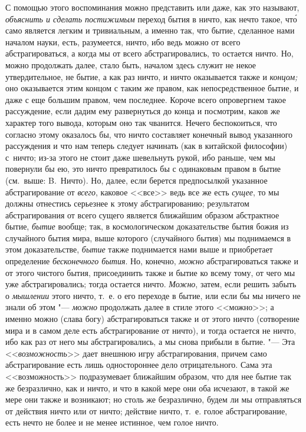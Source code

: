 С помощью этого воспоминания можно представить или даже, как это называют,
{\em объяснить и сделать постижимым} переход бытия в ничто, как нечто такое,
чт\'{о} само является легким и тривиальным, а именно так, что бытие, сделанное
нами началом науки, есть, разумеется, ничто, ибо ведь можно от всего
абстрагироваться, а когда мы от всего абстрагировались, то остается ничто. Но,
можно продолжать далее, стало быть, началом здесь служит не некое
утвердительное, не бытие, а как раз ничто, и ничто оказывается также и
{\em концом;} оно оказывается этим концом с таким же правом, как
непосредственное бытие, и даже с еще большим правом, чем последнее. Короче
всего опровергнем такое рассуждение, если дадим ему развернуться до конца и
посмотрим, каков же характер того вывода, которым оно так чванится. Нечего
беспокоиться, что согласно этому оказалось бы, что ничто составляет конечный
вывод указанного рассуждения и что нам теперь следует начинать (как в китайской
философии) с~ничто; из-за этого не стоит даже шевельнуть рукой, ибо раньше, чем
мы повернули бы ею, это ничто превратилось бы с одинаковым правом в бытие
(см.~выше: B.~Ничто). Но, далее, если берется предпосылкой указанное
абстрагирование от {\em всего}, каковое <<все>> ведь все же есть {\em сущее},
то мы должны отнестись серьезнее к этому абстрагированию; результатом
абстрагирования от всего сущего является ближайшим образом абстрактное бытие,
{\em бытие} вообще; так, в космологическом доказательстве бытия божия из
случайного бытия мира, выше которого (случайного бытия) мы поднимаемся в этом
доказательстве, {\em бытие} также поднимается нами выше и приобретает
определение {\em бесконечного бытия}. Но, конечно, {\em можно} абстрагироваться
также и от этого чистого бытия, присоединить также и бытие ко всему тому, от
чего мы уже абстрагировались; тогда остается ничто. {\em Можно}, затем, если
решить забыть о {\em мышлении} этого ничто, т.~е. о его переходе в бытие, или
если бы мы ничего не знали об этом "--- {\em можно} продолжать далее в стиле
этого <<можно>>; а именно можно (слава богу) абстрагироваться также и от этого
ничто (сотворение мира и в самом деле есть абстрагирование от ничто), и тогда
остается не ничто, ибо как раз от него мы абстрагировались, а мы снова прибыли
в бытие. "--- Эта <<{\em возможность}>> дает внешнюю игру абстрагирования,
причем само абстрагирование есть лишь одностороннее дело отрицательного. Сама
эта <<возможность>> подразумевает ближайшим образом, что для нее бытие так же
безразлично, как и ничто, и что в какой мере они оба исчезают, в такой же мере
они также и возникают; но столь же безразлично, будем ли мы отправляться от
действия ничто или от ничто; действие ничто, т.~е. голое абстрагирование, есть
нечто не более и не менее истинное, чем голое ничто.

